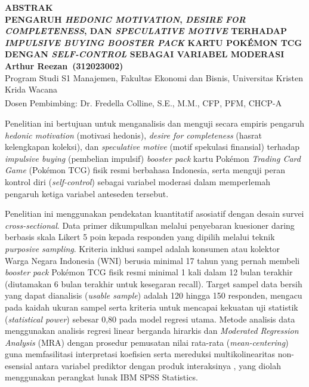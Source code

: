 \documentclass[12pt,a4paper]{article}
\numberwithin{equation}{section}
\numberwithin{table}{section}
\numberwithin{figure}{section}
\newcommand{\ukrida}{Universitas Kristen Krida Wacana}
\newcommand{\feb}{Fakultas Ekonomi dan Bisnis}
\newcommand{\prodi}{Program Studi S1 Manajemen}
\newcommand{\namamahasiswa}{Arthur Reezan}
\newcommand{\nim}{312023002}
\newcommand{\dosbim}{Dr. Fredella Colline, S.E., M.M., CFP\textsuperscript{\textregistered}, PFM, CHCP-A}
\newcommand{\judulskripsi}{PENGARUH \emph{HEDONIC MOTIVATION}, \emph{DESIRE FOR COMPLETENESS}, DAN \emph{SPECULATIVE MOTIVE} TERHADAP \emph{IMPULSIVE BUYING} \emph{BOOSTER PACK} KARTU POK\'EMON TCG DENGAN \emph{SELF-CONTROL} SEBAGAI VARIABEL MODERASI}
\begin{document}
\newpage
\thispagestyle{frontmatter}
\begin{singlespace}
\begin{center}
  {\large\bfseries ABSTRAK}\\[0.3cm]
  {\bfseries\judulskripsi}\\[0.3cm]
  {\bfseries\namamahasiswa\ (\nim)}\\[0.1cm]
  {\footnotesize \prodi, \feb, \ukrida}\\[0.1cm]
  {\footnotesize Dosen Pembimbing: \dosbim}
\end{center}

\vspace{0.25cm}
Penelitian ini bertujuan untuk menganalisis dan menguji secara empiris pengaruh \emph{hedonic motivation} (motivasi hedonis), \emph{desire for completeness} (hasrat kelengkapan koleksi), dan \emph{speculative motive} (motif spekulasi finansial) terhadap \emph{impulsive buying} (pembelian impulsif) \emph{booster pack} kartu Pok\'emon \emph{Trading Card Game} (Pok\'emon TCG) fisik resmi berbahasa Indonesia, serta menguji peran kontrol diri (\emph{self-control}) sebagai variabel moderasi dalam memperlemah pengaruh ketiga variabel anteseden tersebut.

Penelitian ini menggunakan pendekatan kuantitatif asosiatif dengan desain survei \emph{cross-sectional}. Data primer dikumpulkan melalui penyebaran kuesioner daring berbasis skala Likert 5 poin kepada responden yang dipilih melalui teknik \emph{purposive sampling}. Kriteria inklusi sampel adalah konsumen atau kolektor Warga Negara Indonesia (WNI) berusia minimal 17 tahun yang pernah membeli \emph{booster pack} Pok\'emon TCG fisik resmi minimal 1 kali dalam 12 bulan terakhir (diutamakan 6 bulan terakhir untuk kesegaran recall). Target sampel data bersih yang dapat dianalisis (\emph{usable sample}) adalah 120 hingga 150 responden, mengacu pada kaidah ukuran sampel \citet{green1991subjects} serta kriteria \citet{cohen1988statistical} untuk mencapai kekuatan uji statistik (\emph{statistical power}) sebesar 0,80 pada model regresi utama. Metode analisis data menggunakan analisis regresi linear berganda hirarkis dan \emph{Moderated Regression Analysis} (MRA) dengan prosedur pemusatan nilai rata-rata (\emph{mean-centering}) guna memfasilitasi interpretasi koefisien serta mereduksi multikolinearitas non-esensial antara variabel prediktor dengan produk interaksinya \citep{aiken1991multiple, hayes2018introduction}, yang diolah menggunakan perangkat lunak IBM SPSS Statistics.


\end{singlespace}
\end{document}
